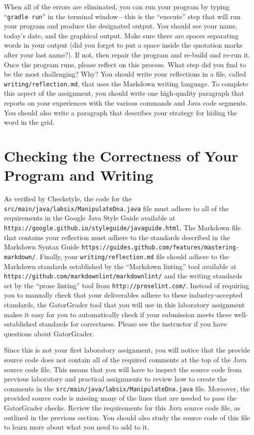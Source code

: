 \documentclass[11pt]{article}
\newcommand{\mainprogramsource}{\lstinline{src/main/java/labsix/ManipulateDna.java}}
\newcommand{\reflection}{\lstinline{writing/reflection.md}}
\newcommand{\gradlerun}{\command{gradle run}}
\newcommand{\command}[1]{``\lstinline{#1}''}
\newcommand{\url}[1]{\lstinline{#1}}
\newcommand{\step}[1]{``{#1}''}
\begin{document}
When all of the errors are eliminated, you can run your program by typing \gradlerun{} in the terminal window---this is
the ``execute'' step that will run your program and produce the designated output. You should see your name, today's
date, and the graphical output. Make sure there are spaces separating words in your output (did you forget to put a
space inside the quotation marks after your last name?). If not, then repair the program and re-build and re-run it.
Once the program runs, please reflect on this process. What step did you find to be the most challenging? Why? You
should write your reflections in a file, called \reflection{}, that uses the Markdown writing language. To complete this
aspect of the assignment, you should write one high-quality paragraph that reports on your experiences with the various
commands and Java code segments. You should also write a paragraph that describes your strategy for hiding the word in
the grid.

\section*{Checking the Correctness of Your Program and Writing}

As verified by Checkstyle, the code for the \mainprogramsource{} file must adhere to all of the requirements in the
Google Java Style Guide available at \url{https://google.github.io/styleguide/javaguide.html}. The Markdown file that
contains your reflection must adhere to the standards described in the Markdown Syntax Guide
\url{https://guides.github.com/features/mastering-markdown/}. Finally, your \reflection{} file should adhere to the
Markdown standards established by the \step{Markdown linting} tool available at
\url{https://github.com/markdownlint/markdownlint/} and the writing standards set by the \step{prose linting} tool from
\url{http://proselint.com/}. Instead of requiring you to manually check that your deliverables adhere to these
industry-accepted standards, the GatorGrader tool that you will use in this laboratory assignment makes it easy for you
to automatically check if your submission meets these well-established standards for correctness. Please see the
instructor if you have questions about GatorGrader.

Since this is not your first laboratory assignment, you will notice that the provide source code does not contain all of
the required comments at the top of the Java source code file. This means that you will have to inspect the source code
from previous laboratory and practical assignments to review how to create the comments in the \mainprogramsource{}
file. Moreover, the provided source code is missing many of the lines that are needed to pass the GatorGrader checks.
Review the requirements for this Java source code file, as outlined in the previous section. You should also study the
source code of this file to learn more about what you need to add to it.
\end{document}
